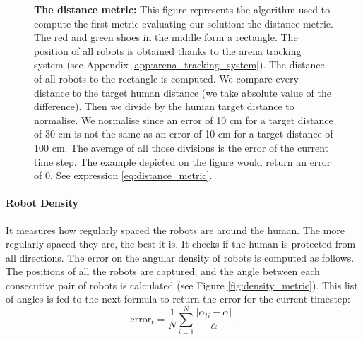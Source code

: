 \documentclass[oneside, a4paper, 12pt]{memoir}
\newcommand{\epuckblue}[3][0] %
{
	\draw [very thick, fill=RoyalBlue] (#2,#3) circle [radius=0.5];
	\draw [very thick, rotate around={#1:(#2,#3)}] (#2-0.25,#3-0.433) -- (#2,#3+0.45) -- (#2+0.25,#3-0.433);
}
\let\oldCaption\caption
\renewcommand{\caption}[2]{
\oldCaption[#1]{{\small\sffamily\bfseries #1:} #2}
}
\begin{document}
\begin{figure}[!htp]
						
						\caption{The distance metric}{This figure represents the algorithm used to compute the first metric evaluating our solution: the distance metric. The red and green shoes in the middle form a rectangle. The position of all robots is obtained thanks to the arena tracking system (see Appendix \ref{app:arena_tracking_system}). The distance of all robots to the rectangle is computed. We compare every distance to the target human distance (we take absolute value of the difference). Then we divide by the human target distance to normalise. We normalise since an error of 10 cm for a target distance of 30 cm is not the same as an error of 10 cm for a target distance of 100 cm. The average of all those divisions is the error of the current time step. The example depicted on the figure would return an error of 0. See expression \ref{eq:distance_metric}.}
						\label{fig:distance_metric}
					\end{figure}
				
				\paragraph{Robot Density}

					
					It measures how regularly spaced the robots are around the human. The more regularly spaced they are, the best it is. It checks if the human is protected from all directions. The error on the angular density of robots is computed as follows. The positions of all the robots are captured, and the angle between each consecutive pair of robots is calculated (see Figure \ref{fig:density_metric}). This list of angles is fed to the next formula to return the error for the current timestep:
					\begin{equation}
						\mbox{error}_t = \frac{1}{N} \sum_{i=1}^N \frac{|\alpha_{ti} - \overline{\alpha}|}{\overline{\alpha}},
						\label{eq:density_metric}
					\end{equation}
					
\end{document}
